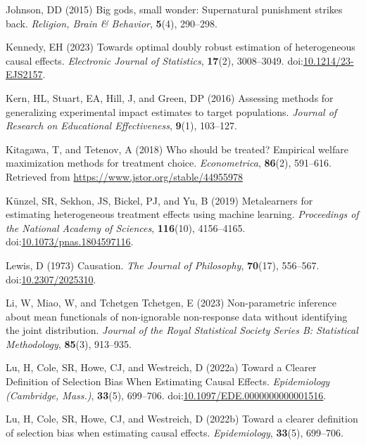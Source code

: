 \documentclass[
  singlecolumn]{article}
\newlength{\cslhangindent}
\newenvironment{CSLReferences}[2] %
 {\begin{list}{}{%
  \setlength{\itemindent}{0pt}
  \setlength{\leftmargin}{0pt}
  \setlength{\parsep}{0pt}
  \ifodd #1
   \setlength{\leftmargin}{\cslhangindent}
   \setlength{\itemindent}{-1\cslhangindent}
  \fi
  \setlength{\itemsep}{#2\baselineskip}}}
 {\end{list}}
\begin{document}
\begin{CSLReferences}{1}{0}
Johnson, DD (2015) Big gods, small wonder: Supernatural punishment
strikes back. \emph{Religion, Brain \& Behavior}, \textbf{5}(4),
290--298.

Kennedy, EH (2023) Towards optimal doubly robust estimation of
heterogeneous causal effects. \emph{Electronic Journal of Statistics},
\textbf{17}(2), 3008--3049.
doi:\href{https://doi.org/10.1214/23-EJS2157}{10.1214/23-EJS2157}.

Kern, HL, Stuart, EA, Hill, J, and Green, DP (2016) Assessing methods
for generalizing experimental impact estimates to target populations.
\emph{Journal of Research on Educational Effectiveness}, \textbf{9}(1),
103--127.

Kitagawa, T, and Tetenov, A (2018) Who should be treated? Empirical
welfare maximization methods for treatment choice. \emph{Econometrica},
\textbf{86}(2), 591--616. Retrieved from
\url{https://www.jstor.org/stable/44955978}

Künzel, SR, Sekhon, JS, Bickel, PJ, and Yu, B (2019) Metalearners for
estimating heterogeneous treatment effects using machine learning.
\emph{Proceedings of the National Academy of Sciences},
\textbf{116}(10), 4156--4165.
doi:\href{https://doi.org/10.1073/pnas.1804597116}{10.1073/pnas.1804597116}.

Lewis, D (1973) Causation. \emph{The Journal of Philosophy},
\textbf{70}(17), 556--567.
doi:\href{https://doi.org/10.2307/2025310}{10.2307/2025310}.

Li, W, Miao, W, and Tchetgen Tchetgen, E (2023) Non-parametric inference
about mean functionals of non-ignorable non-response data without
identifying the joint distribution. \emph{Journal of the Royal
Statistical Society Series B: Statistical Methodology}, \textbf{85}(3),
913--935.

Lu, H, Cole, SR, Howe, CJ, and Westreich, D (2022a) Toward a Clearer
Definition of Selection Bias When Estimating Causal Effects.
\emph{Epidemiology (Cambridge, Mass.)}, \textbf{33}(5), 699--706.
doi:\href{https://doi.org/10.1097/EDE.0000000000001516}{10.1097/EDE.0000000000001516}.

Lu, H, Cole, SR, Howe, CJ, and Westreich, D (2022b) Toward a clearer
definition of selection bias when estimating causal effects.
\emph{Epidemiology}, \textbf{33}(5), 699--706.


\end{CSLReferences}
\end{document}

